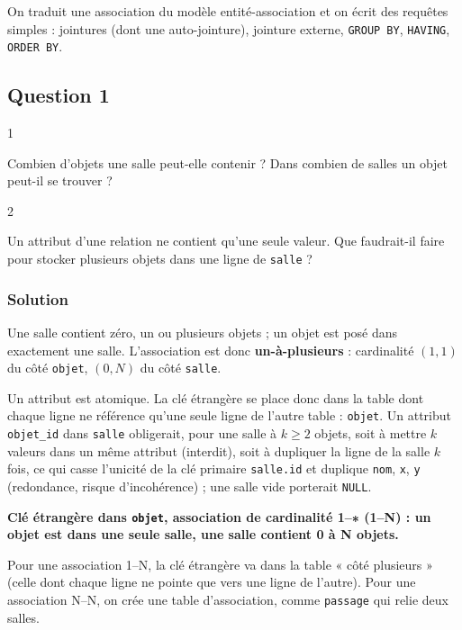 \documentclass[11pt,a4paper]{article}
\begin{document}
On traduit une association du modèle entité-association et on écrit des requêtes simples : jointures (dont une auto-jointure), jointure externe, \texttt{GROUP\ BY}, \texttt{HAVING}, \texttt{ORDER\ BY}.

\hypertarget{question-1}{%
\subsection{Question 1}\label{question-1}}

\begin{indication}{1}

Combien d'objets une salle peut-elle contenir ? Dans combien de salles un objet peut-il se trouver ?

\end{indication}

\begin{indication}{2}

Un attribut d'une relation ne contient qu'une seule valeur. Que faudrait-il faire pour stocker plusieurs objets dans une ligne de \texttt{salle} ?

\end{indication}

\hypertarget{solution}{%
\subsubsection{Solution}\label{solution}}

Une salle contient zéro, un ou plusieurs objets ; un objet est posé dans exactement une salle. L'association est donc \textbf{un-à-plusieurs} : cardinalité \((1,1)\) du côté \texttt{objet}, \((0,N)\) du côté \texttt{salle}.

Un attribut est atomique. La clé étrangère se place donc dans la table dont chaque ligne ne référence qu'une seule ligne de l'autre table : \texttt{objet}. Un attribut \texttt{objet\_id} dans \texttt{salle} obligerait, pour une salle à \(k \ge 2\) objets, soit à mettre \(k\) valeurs dans un même attribut (interdit), soit à dupliquer la ligne de la salle \(k\) fois, ce qui casse l'unicité de la clé primaire \texttt{salle.id} et duplique \texttt{nom}, \texttt{x}, \texttt{y} (redondance, risque d'incohérence) ; une salle vide porterait \texttt{NULL}.

\textbf{Clé étrangère dans \texttt{objet}, association de cardinalité 1--∗ (1--N) : un objet est dans une seule salle, une salle contient 0 à N objets.}

\begin{methode}

Pour une association 1--N, la clé étrangère va dans la table « côté plusieurs » (celle dont chaque ligne ne pointe que vers une ligne de l'autre). Pour une association N--N, on crée une table d'association, comme \texttt{passage} qui relie deux salles.

\end{methode}
\end{document}

